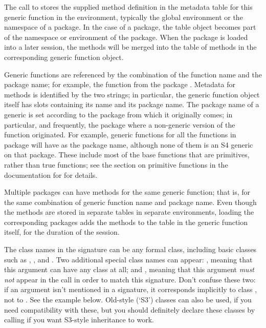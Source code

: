 \begin{Details}\relax
The call to  stores the supplied method definition  in
the metadata table for this generic function in the environment,
typically the global environment or the namespace of a package.
In the case of a package, the table object becomes part of the namespace or environment of the
package.
When the package is loaded into a later session, the
methods will be merged into the table of methods in the corresponding
generic function object.

Generic functions are referenced by the combination of the function name and
the package name;
for example, the function  from the package
.
Metadata for methods is identified by the two strings; in particular, the
generic function object itself has slots containing its name and its
package name.
The package name of a generic is set according to the package
from which it originally comes; in particular, and frequently, the
package where a non-generic version of the function originated.
For example, generic functions for all the functions in package  will
have  as the package name, although none of them is an
S4 generic on that package.
These include most of the base functions that are primitives, rather than
true functions; see the section on primitive functions in the
documentation for  for details.

Multiple packages can have methods for the same generic function; that
is, for the same combination of generic function name and package
name.
Even though the methods are stored in separate tables in separate
environments, loading the corresponding packages adds the methods to
the table in the generic function itself, for the duration of the session.

The class
names in the signature can be any formal class, including basic
classes such as , , and
.  Two additional special class names can appear:
, meaning that this argument can have any class at all;
and , meaning that this argument \emph{must not}
appear in the call in order to match this signature.  Don't confuse
these two:  if an argument isn't mentioned in a signature, it
corresponds implicitly to class , not to
.  See the example below.  Old-style (`S3')
classes can also be used, if you need compatibility with these, but
you should definitely declare these classes by calling
 if you want S3-style inheritance to work.



\end{Details}
